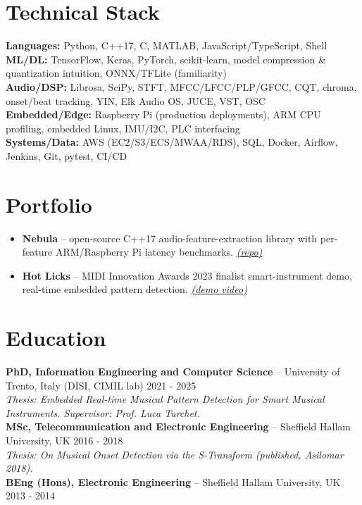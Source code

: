 \documentclass[11pt]{article}
\begin{document}
\section*{Technical Stack}
\textbf{Languages:} Python, C++17, C, MATLAB, JavaScript/TypeScript, Shell \\
\textbf{ML/DL:} TensorFlow, Keras, PyTorch, scikit-learn, model compression \& quantization intuition, ONNX/TFLite (familiarity) \\
\textbf{Audio/DSP:} Librosa, SciPy, STFT, MFCC/LFCC/PLP/GFCC, CQT, chroma, onset/beat tracking, YIN, Elk Audio OS, JUCE, VST, OSC \\
\textbf{Embedded/Edge:} Raspberry Pi (production deployments), ARM CPU profiling, embedded Linux, IMU/I2C, PLC interfacing \\
\textbf{Systems/Data:} AWS (EC2/S3/ECS/MWAA/RDS), SQL, Docker, Airflow, Jenkins, Git, pytest, CI/CD

\section*{Portfolio}
\begin{itemize}[leftmargin=1.4em, itemsep=-0.2em, topsep=0.1em]
    \item \textbf{Nebula} -- open-source C++17 audio-feature-extraction library with per-feature ARM/Raspberry Pi latency benchmarks. \href{https://github.com/ns2max/nebula}{\textit{(repo)}}
    \item \textbf{Hot Licks} -- MIDI Innovation Awards 2023 finalist smart-instrument demo, real-time embedded pattern detection. \href{https://youtu.be/gkOqfOT8zXM}{\textit{(demo video)}}
\end{itemize}

\section*{Education}
\textbf{PhD, Information Engineering and Computer Science} -- University of Trento, Italy (DISI, CIMIL lab) \hfill 2021 - 2025 \\
\textit{Thesis: Embedded Real-time Musical Pattern Detection for Smart Musical Instruments. Supervisor: Prof. Luca Turchet.} \\
\textbf{MSc, Telecommunication and Electronic Engineering} -- Sheffield Hallam University, UK \hfill 2016 - 2018 \\
\textit{Thesis: On Musical Onset Detection via the S-Transform (published, Asilomar 2018).} \\
\textbf{BEng (Hons), Electronic Engineering} -- Sheffield Hallam University, UK \hfill 2013 - 2014
\end{document}
